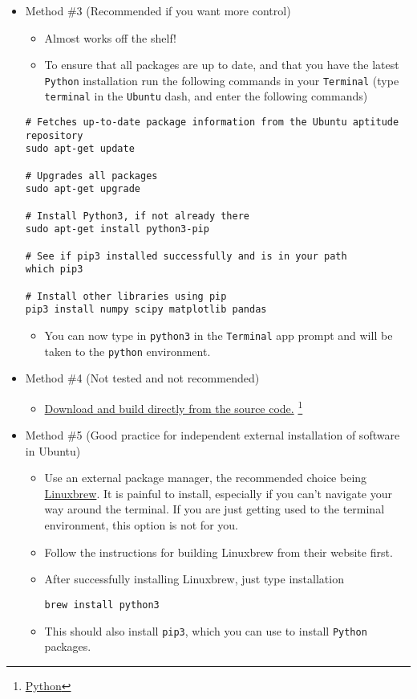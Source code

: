 \documentclass[11pt]{article}
\begin{document}
\begin{itemize}
\item Method \#3 (Recommended if you want more control)
\label{sec:org0552b3e}
\begin{itemize}
\item Almost works off the shelf!
\item To ensure that all packages are up to date, and that you have the latest
\texttt{Python} installation run the following commands in your \texttt{Terminal} (type
\texttt{terminal} in the \texttt{Ubuntu} dash, and enter the following commands)
\end{itemize}

\begin{verbatim}
# Fetches up-to-date package information from the Ubuntu aptitude repository
sudo apt-get update

# Upgrades all packages
sudo apt-get upgrade

# Install Python3, if not already there
sudo apt-get install python3-pip

# See if pip3 installed successfully and is in your path
which pip3

# Install other libraries using pip
pip3 install numpy scipy matplotlib pandas

\end{verbatim}
\begin{itemize}
\item You can now type in \texttt{python3} in the \texttt{Terminal} app prompt and will be taken
to the \texttt{python} environment.
\end{itemize}

\item Method \#4 (Not tested and not recommended)
\label{sec:org8559ca5}
\begin{itemize}
\item \href{https://www.python.org/downloads/source/}{Download and build directly from the source code.} \footnote{\href{https://www.python.org/}{Python}}
\end{itemize}
\item Method \#5 (Good practice for independent external installation of software in Ubuntu)
\label{sec:org1e266cf}
\begin{itemize}
\item Use an external package manager, the recommended choice being \href{https://linuxbrew.sh/}{Linuxbrew}. It
is painful to install, especially if you can't navigate your way
around the terminal. If you are just getting used to the terminal
environment, this option is not for you.
\item Follow the instructions for building Linuxbrew from their website first.
\item After successfully installing Linuxbrew, just type installation
\begin{verbatim}
brew install python3
\end{verbatim}
\item This should also install \texttt{pip3}, which you can use to install \texttt{Python} packages.
\end{itemize}
\end{itemize}
\end{document}
